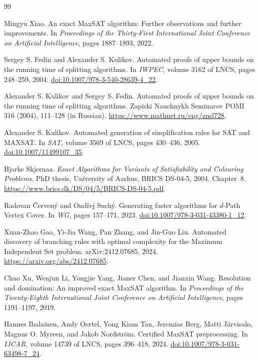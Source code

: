 \documentclass[10pt,twoside]{article}
\theoremstyle{definition}
\theoremstyle{remark}
\begin{document}
\begin{thebibliography}{99}

Mingyu Xiao.
\newblock An exact MaxSAT algorithm: Further observations and further
improvements.
\newblock In \emph{Proceedings of the Thirty-First International Joint
Conference on Artificial Intelligence}, pages 1887--1893, 2022.

Sergey S. Fedin and Alexander S. Kulikov.
\newblock Automated proofs of upper bounds on the running time of splitting algorithms.
\newblock In \emph{IWPEC}, volume 3162 of LNCS, pages 248--259, 2004.
\newblock \href{https://doi.org/10.1007/978-3-540-28639-4_22}{doi:10.1007/978-3-540-28639-4\_22}.

Alexander S. Kulikov and Sergey S. Fedin.
\newblock Automated proofs of upper bounds on the running time of splitting algorithms.
\newblock Zapiski Nauchnykh Seminarov POMI 316 (2004), 111--128 (in Russian).
\newblock \url{https://www.mathnet.ru/eng/znsl728}.

Alexander S. Kulikov.
\newblock Automated generation of simplification rules for SAT and MAXSAT.
\newblock In \emph{SAT}, volume 3569 of LNCS, pages 430--436, 2005.
\newblock \href{https://doi.org/10.1007/11499107_35}{doi:10.1007/11499107\_35}.

Bjarke Skjernaa.
\newblock \emph{Exact Algorithms for Variants of Satisfiability and Colouring Problems}.
\newblock PhD thesis, University of Aarhus, BRICS DS-04-5, 2004. Chapter~8.
\newblock \url{https://www.brics.dk/DS/04/5/BRICS-DS-04-5.pdf}.

Radovan \v{C}erven\'y and Ond\v{r}ej Such\'y.
\newblock Generating faster algorithms for $d$-Path Vertex Cover.
\newblock In \emph{WG}, pages 157--171, 2023.
\newblock \href{https://doi.org/10.1007/978-3-031-43380-1_12}{doi:10.1007/978-3-031-43380-1\_12}.

Xuan-Zhao Gao, Yi-Jia Wang, Pan Zhang, and Jin-Guo Liu.
\newblock Automated discovery of branching rules with optimal complexity for
  the Maximum Independent Set problem.
\newblock arXiv:2412.07685, 2024.
\newblock \url{https://arxiv.org/abs/2412.07685}.

Chao Xu, Wenjun Li, Yongjie Yang, Jianer Chen, and Jianxin Wang.
\newblock Resolution and domination: An improved exact MaxSAT algorithm.
\newblock In \emph{Proceedings of the Twenty-Eighth International Joint
Conference on Artificial Intelligence}, pages 1191--1197, 2019.

Hannes Ihalainen, Andy Oertel, Yong Kiam Tan, Jeremias Berg,
Matti J\"arvisalo, Magnus O. Myreen, and Jakob Nordstr\"om.
\newblock Certified MaxSAT preprocessing.
\newblock In \emph{IJCAR}, volume 14739 of LNCS, pages 396--418, 2024.
\newblock \href{https://doi.org/10.1007/978-3-031-63498-7_24}{doi:10.1007/978-3-031-63498-7\_24}.

\end{thebibliography}
\end{document}
